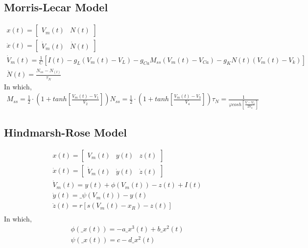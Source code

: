 \subsection{Morris-Lecar Model}
\begin{align}
    x(t) = \begin{bmatrix}V_m(t) & N(t)\end{bmatrix} \label{eq:smm-ml-1} \\
    \dot x(t) = \begin{bmatrix}\dot V_m(t) & \dot N(t)\end{bmatrix} \label{eq:smm-ml-2} \\
    \dot V_m(t) = \frac{1}{C}[I(t) - g_L(V_m(t) - V_L) - g_{Ca}M_{ss}(V_m(t) - V_{Ca})-g_KN(t)(V_m(t)-V_k)]\label{eq:smm-ml-3} \\
    \dot N(t) = \frac{N_{ss} - N_(t)}{\tau_N}\label{eq:smm-ml-3}
\end{align}
In which,
\begin{align}
M_{ss} = \frac12\cdot (1+tanh[\frac{V_m(t)-V_1}{V_2}])
N_{ss} = \frac12\cdot (1+tanh[\frac{V_m(t)-V_3}{V_4}])
\tau_N = \frac{1}{\varphi cosh[\frac{V-V_3}{2V_4}]}
\end{align}

\subsection{Hindmarsh-Rose Model}
\begin{align}
    x(t) = \begin{bmatrix} V_m(t) & y(t) & z(t) \end{bmatrix} \label{eq:smm-hr-1} \\
    \dot x(t) = \begin{bmatrix} \dot V_m(t) & \dot y(t) & \dot z(t) \end{bmatrix} \label{eq:smm-hr-1} \\
    \dot V_m(t) = y(t) + \phi(V_m(t)) - z(t) + I(t) \\
    \dot y(t) = \_\psi(V_m(t)) - y(t) \\
    \dot z(t) = r[s(V_m(t) - x_R)-z(t)] \\
\end{align}
In which,
\begin{align}
\phi(\_x(t)) = -a\_x^3(t) + b\_x^2(t) \\
\psi(\_x(t)) = c - d\_x^2(t) \\
\end{align}

